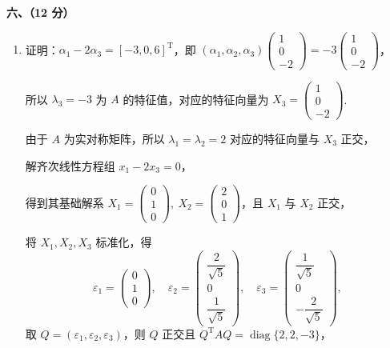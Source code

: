 \documentclass[a4paper,11pt]{ctexart}
\newcommand{\T}{\mathrm{T}}
\newcommand{\diag}{\operatorname{diag}}
\newcommand{\score}[1]{\hfill\text{#1 分}}
\begin{document}
\vspace{0.8em}

\textbf{六、（12 分）}

\begin{enumerate}[label=(\arabic*), leftmargin=2.4em, itemsep=0.35em, topsep=0.3em]
  \item 证明：$\alpha_1 - 2\alpha_3 = [-3, 0, 6]^{\T}$，即 $(\alpha_1, \alpha_2, \alpha_3)\begin{pmatrix} 1 \\ 0 \\ -2 \end{pmatrix} = -3\begin{pmatrix} 1 \\ 0 \\ -2 \end{pmatrix}$，

  所以 $\lambda_3 = -3$ 为 $A$ 的特征值，对应的特征向量为 $X_3 = \begin{pmatrix} 1 \\ 0 \\ -2 \end{pmatrix}$. \score{2}

  由于 $A$ 为实对称矩阵，所以 $\lambda_1 = \lambda_2 = 2$ 对应的特征向量与 $X_3$ 正交，

  解齐次线性方程组 $x_1 - 2x_3 = 0$，

  得到其基础解系 $X_1 = \begin{pmatrix} 0 \\ 1 \\ 0 \end{pmatrix},\ X_2 = \begin{pmatrix} 2 \\ 0 \\ 1 \end{pmatrix}$，且 $X_1$ 与 $X_2$ 正交， \score{4}

  将 $X_1, X_2, X_3$ 标准化，得
  \[
    \varepsilon_1 = \begin{pmatrix} 0 \\ 1 \\ 0 \end{pmatrix},\quad
    \varepsilon_2 = \begin{pmatrix} \dfrac{2}{\sqrt{5}} \\[0.6em] 0 \\[0.6em] \dfrac{1}{\sqrt{5}} \end{pmatrix},\quad
    \varepsilon_3 = \begin{pmatrix} \dfrac{1}{\sqrt{5}} \\[0.6em] 0 \\[0.6em] -\dfrac{2}{\sqrt{5}} \end{pmatrix},
  \]
  取 $Q = (\varepsilon_1, \varepsilon_2, \varepsilon_3)$，则 $Q$ 正交且 $Q^{\T}AQ = \diag\{2, 2, -3\}$，


\end{enumerate}
\end{document}
